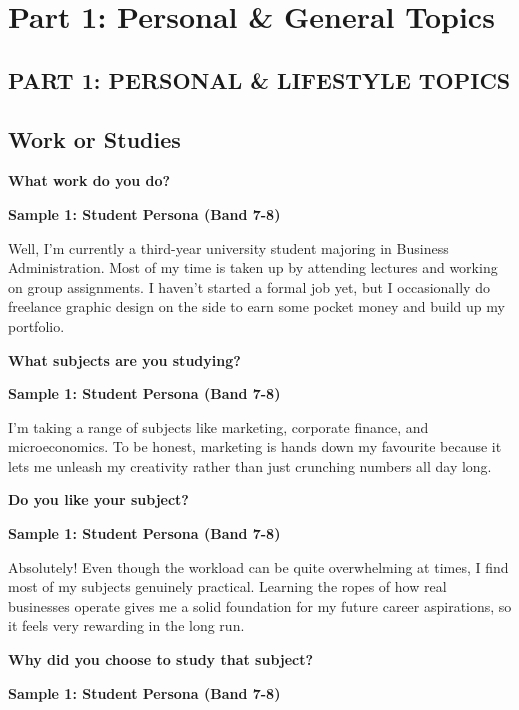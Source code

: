 \chapter{Part 1: Personal \& General Topics}

\section*{PART 1: PERSONAL \& LIFESTYLE TOPICS}

\section{Work or Studies}
\begin{ieltsquestion}
\textbf{What work do you do?}
\end{ieltsquestion}
\textbf{Sample 1: Student Persona (Band 7-8)}

Well, I'm currently a third-year university student majoring in Business Administration. Most of my time is taken up by attending lectures and working on group assignments. I haven't started a formal job yet, but I occasionally do freelance graphic design on the side to earn some pocket money and build up my portfolio.

\separator

\begin{ieltsquestion}
\textbf{What subjects are you studying?}
\end{ieltsquestion}
\textbf{Sample 1: Student Persona (Band 7-8)}

I'm taking a range of subjects like marketing, corporate finance, and microeconomics. To be honest, marketing is hands down my favourite because it lets me unleash my creativity rather than just crunching numbers all day long.

\separator

\begin{ieltsquestion}
\textbf{Do you like your subject?}
\end{ieltsquestion}
\textbf{Sample 1: Student Persona (Band 7-8)}

Absolutely! Even though the workload can be quite overwhelming at times, I find most of my subjects genuinely practical. Learning the ropes of how real businesses operate gives me a solid foundation for my future career aspirations, so it feels very rewarding in the long run.

\separator

\begin{ieltsquestion}
\textbf{Why did you choose to study that subject?}
\end{ieltsquestion}
\textbf{Sample 1: Student Persona (Band 7-8)}

